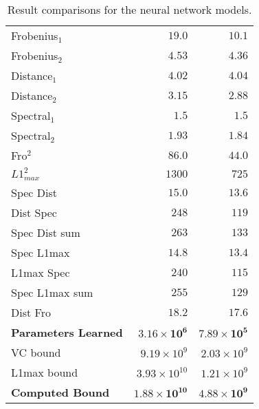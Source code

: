 \documentclass[11pt, reqno]{amsart}
\begin{document}
\begin{table}[h]
\begin{minipage}{.6\textwidth}
\begin{tabular}{| l | r | r |}
          \midrule
          Frobenius$_1$             & $19.0$                              & $10.1$                              \\
          Frobenius$_2$             & $4.53$                              & $4.36$                              \\
          Distance$_1$              & $4.02$                              & $4.04$                              \\
          Distance$_2$              & $3.15$                              & $2.88$                              \\
          Spectral$_1$              & $1.5$                               & $1.5$                               \\
          Spectral$_2$              & $1.93$                              & $1.84$                              \\
          Fro$^2$                   & $86.0$                              & $44.0$                              \\
          $L1_{max}^2$ 	            & $1300$                              & $725$                               \\
          Spec Dist 	              & $15.0$                              & $13.6$                              \\
          Dist Spec 	              & $248$                               & $119$                               \\
          Spec Dist sum 	          & $263$                               & $133$                               \\
          Spec L1max 	              & $14.8$                              & $13.4$                              \\
          L1max Spec 	              & $240$                               & $115$                               \\
          Spec L1max sum 	          & $255$                               & $129$                               \\
          Dist Fro 	                & $18.2$                              & $17.6$                              \\
          \textbf{Parameters Learned} & $\mathbf{3.16 \times 10^{6}}$     & $\mathbf{7.89 \times 10^{5}}$                \\
          VC bound 	                & $9.19 \times 10^{9}$                & $2.03 \times 10^{9}$                \\
          L1max bound 	            & $3.93 \times 10^{10}$               & $1.21 \times 10^{9}$                \\
          \midrule
          \textbf{Computed Bound}   & $\mathbf{1.88 \times 10^{10}}$      & $\mathbf{4.88 \times 10^{9}}$       \\
          \toprule
        \end{tabular}
        \caption{Result comparisons for the neural network models.}~\label{tab:params}
      \end{minipage}%
    \end{table}


\end{document}
